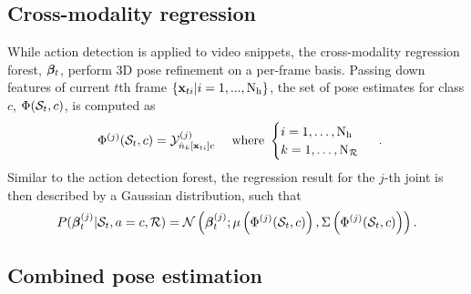 \subsection{Cross-modality regression}

While action detection is applied to video snippets, the cross-modality regression forest, $\boldsymbol{\beta}_{t}$, perform 3D pose refinement on a per-frame basis. 
Passing down features of current $t$th frame $\{\mathbf{x}_{ti}|i = 1,...,\mathrm{N_{h}}\}$, the set of pose estimates for class $c$, $\Phi(\mathcal{S}_{t}, c)$, is computed as
\begin{equation}
	\label{eqn/body/regressset}
	\begin{array}{lr}
		\Phi^{(j)}(\mathcal{S}_{t}, c) = \mathcal{Y}^{(j)}_{{\hat{n}}_{k}[\mathbf{x}_{ti}]c}
		& \mbox{ where } 
		\begin{cases}
			i = 1,\dots,\mathrm{N_{h}} \\ 
			k = 1,\dots,\mathrm{N_{\mathcal{R}}}
		\end{cases}
	\end{array}.
\end{equation} 
Similar to the action detection forest, the regression result for the $j$-th joint is then described by a Gaussian distribution, such that 
\begin{equation}
	\label{eqn/body/regressiongaussian}
	P( \boldsymbol{\beta}_{t}^{(j)}| \mathcal{S}_{t}, a = c, \mathcal{R}) = \mathcal{N}\left(\boldsymbol{\beta}_{t}^{(j)};\mu\left(\Phi^{(j)}(\mathcal{S}_{t}, c)\right),\Sigma\left(\Phi^{(j)}(\mathcal{S}_{t},c)\right)\right). 
\end{equation}

\subsection{Combined pose estimation}

